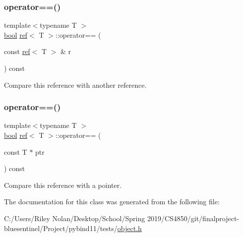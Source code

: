 \subsubsection{\texorpdfstring{operator==()}{operator==()}\hspace{0.1cm}{\footnotesize\ttfamily [1/2]}}
{\footnotesize\ttfamily template$<$typename T $>$ \\
\mbox{\hyperlink{asdl_8h_af6a258d8f3ee5206d682d799316314b1}{bool}} \mbox{\hyperlink{classref}{ref}}$<$ T $>$\+::operator== (\begin{DoxyParamCaption}\item[{const \mbox{\hyperlink{classref}{ref}}$<$ T $>$ \&}]{r }\end{DoxyParamCaption}) const\hspace{0.3cm}{\ttfamily [inline]}}



Compare this reference with another reference. 

\mbox{\label{classref_a6131b1c40dd6977c7e005826ba660213}} 
\subsubsection{\texorpdfstring{operator==()}{operator==()}\hspace{0.1cm}{\footnotesize\ttfamily [2/2]}}
{\footnotesize\ttfamily template$<$typename T $>$ \\
\mbox{\hyperlink{asdl_8h_af6a258d8f3ee5206d682d799316314b1}{bool}} \mbox{\hyperlink{classref}{ref}}$<$ T $>$\+::operator== (\begin{DoxyParamCaption}\item[{const T $\ast$}]{ptr }\end{DoxyParamCaption}) const\hspace{0.3cm}{\ttfamily [inline]}}



Compare this reference with a pointer. 



The documentation for this class was generated from the following file\+:\begin{DoxyCompactItemize}
\item 
C\+:/\+Users/\+Riley Nolan/\+Desktop/\+School/\+Spring 2019/\+C\+S4850/git/finalproject-\/bluesentinel/\+Project/pybind11/tests/\mbox{\hyperlink{pybind11_2tests_2object_8h}{object.\+h}}\end{DoxyCompactItemize}
